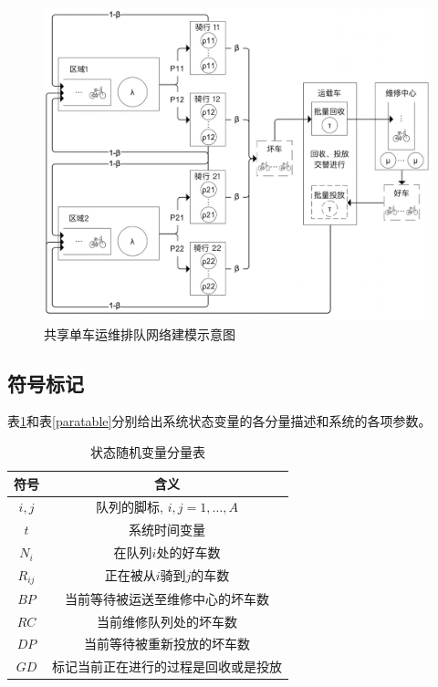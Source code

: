 \documentclass{article}
\begin{document}
\begin{figure}[H]
    \centering
    \includegraphics[scale=0.4]{./model/model.png}
    \caption{共享单车运维排队网络建模示意图}
    \label{cenmodel}
\end{figure}

\subsection{符号标记}
表\ref{rvtable}和表\ref{paratable}分别给出系统状态变量的各分量描述和系统的各项参数。
\begin{table}[H]
    \centering
    \caption{状态随机变量分量表}
    \begin{tabular}{ |c|c| } 
     \hline
     符号 & 含义 \\ 
     \hline
     $i, j$ & 队列的脚标, $i,j = 1, \dots, A$ \\ 
     \hline
     $t$ & 系统时间变量\\ 
     \hline
     $N_i$ & 在队列$i$处的好车数\\
     \hline
     $R_{ij}$ & 正在被从$i$骑到$j$的车数 \\ 
     \hline
     $BP$ & 当前等待被运送至维修中心的坏车数 \\
     \hline
     $RC$ & 当前维修队列处的坏车数 \\
     \hline
     $DP$ & 当前等待被重新投放的坏车数 \\
     \hline
     $GD$ & 标记当前正在进行的过程是回收或是投放 \\
     \hline
    \end{tabular}
    \label{rvtable}
\end{table}
\end{document}
